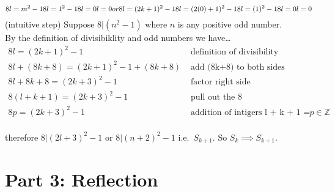 \documentclass[
]{article}
\begin{document}
\[
8l = m^2-1 \\
8l = 1^2-1 \\
8l = 0 \\
l = 0 \\
or \\
8l = (2k +1)^2-1 \\
8l = (2(0)+1)^2-1 \\
8l = (1)^2-1 \\
8l = 0 \\
l = 0
\] (intuitive step) Suppose \(8|(n^2-1)\) where \(n\) is any positive
odd number.\\
By the definition of divisibiklity and odd numbers we have\ldots{} \[
\begin{equation} 
\begin{split}
8l = (2k +1)^2-1 & \text{ definition of divisibility } \\
8l + (8k+8) = (2k +1)^2-1 + (8k+8) & \text{ add (8k+8) to both sides} \\
8l + 8k+8 = (2k + 3)^2-1 & \text{ factor right side} \\
8(l + k + 1) = (2k + 3)^2-1 & \text{ pull out the 8} \\
8p = (2k + 3)^2-1 & \text{ addition of intigers l + k + 1 = p where } p \in \mathbb{Z} \\
\end{split}
\end{equation} 
\]

therefore \(8|(2l+3)^2-1\) or \(8|(n+2)^2-1\) i.e.~\(S_{k+1}\). So
\(S_k \implies S_{k+1}\).

\hypertarget{part-3-reflection}{%
\section{Part 3: Reflection}\label{part-3-reflection}}
\end{document}
